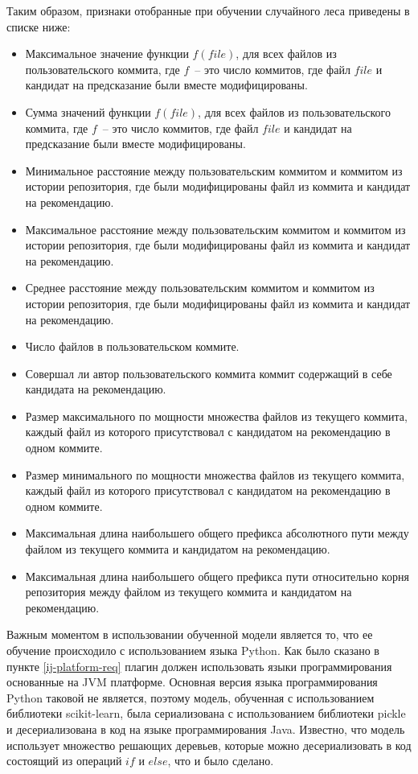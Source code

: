 Таким образом, признаки отобранные при обучении случайного леса приведены в списке ниже:
\begin{itemize}
    \item Максимальное значение функции $f(file)$, для всех файлов из пользовательского коммита, где $f$~-- это число коммитов, где файл $file$ и кандидат на предсказание были вместе модифицированы.
    \item Сумма значений функции $f(file)$, для всех файлов из пользовательского коммита, где $f$~-- это число коммитов, где файл $file$ и кандидат на предсказание были вместе модифицированы.
    \item Минимальное расстояние между пользовательским коммитом и коммитом из истории репозитория, где были модифицированы файл из коммита и кандидат на рекомендацию.
    \item Максимальное расстояние между пользовательским коммитом и коммитом из истории репозитория, где были модифицированы файл из коммита и кандидат на рекомендацию.
    \item Среднее расстояние между пользовательским коммитом и коммитом из истории репозитория, где были модифицированы файл из коммита и кандидат на рекомендацию.
    \item Число файлов в пользовательском коммите.
    \item Совершал ли автор пользовательского коммита коммит содержащий в себе кандидата на рекомендацию.
    \item Размер максимального по мощности множества файлов из текущего коммита, каждый файл из которого присутствовал с кандидатом на рекомендацию в одном коммите.
    \item Размер минимального по мощности множества файлов из текущего коммита, каждый файл из которого присутствовал с кандидатом на рекомендацию в одном коммите.
    \item Максимальная длина наибольшего общего префикса абсолютного пути между файлом из текущего коммита и кандидатом на рекомендацию.
    \item Максимальная длина наибольшего общего префикса пути относительно корня репозитория между файлом из текущего коммита и кандидатом на рекомендацию.
\end{itemize}

Важным моментом в использовании обученной модели является то, что ее обучение происходило с использованием языка Python. Как было сказано в пункте \ref{ij-platform-req} плагин должен использовать языки программирования основанные на JVM платформе. Основная версия языка программирования Python таковой не является, поэтому модель, обученная с использованием библиотеки scikit-learn, была сериализована с использованием библиотеки pickle и десериализована в код на языке программирования Java. Известно, что модель использует множество решающих деревьев, которые можно десериализовать в код состоящий из операций $if$ и $else$, что и было сделано. 

